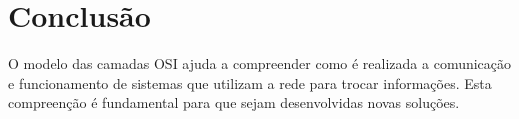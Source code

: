 \section{Conclusão}


O modelo das camadas OSI ajuda a compreender como é realizada a comunicação e funcionamento de sistemas que utilizam a rede para trocar informações. Esta compreenção é fundamental para que sejam desenvolvidas novas soluções.



